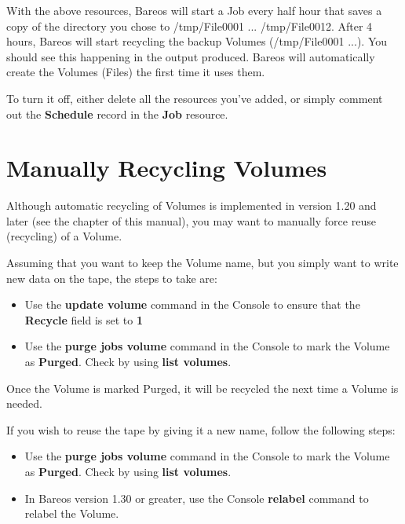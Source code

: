 With the above resources, Bareos will start a Job every half hour that saves a
copy of the directory you chose to /tmp/File0001 ... /tmp/File0012. After 4
hours, Bareos will start recycling the backup Volumes (/tmp/File0001 ...). You
should see this happening in the output produced. Bareos will automatically
create the Volumes (Files) the first time it uses them.

To turn it off, either delete all the resources you've added, or simply
comment out the {\bf Schedule} record in the {\bf Job} resource.

\section{Manually Recycling Volumes}
\label{manualrecycling}


Although automatic recycling of Volumes is implemented in version 1.20 and
later (see the
 chapter of
this manual), you may want to manually force reuse (recycling) of a Volume.

Assuming that you want to keep the Volume name, but you simply want to write
new data on the tape, the steps to take are:

\begin{itemize}
\item Use the {\bf update volume} command in the Console to  ensure that the
   {\bf Recycle} field is set to {\bf 1}
\item Use the {\bf purge jobs volume} command in the Console  to mark the
   Volume as {\bf Purged}. Check by using  {\bf list volumes}.
\end{itemize}

Once the Volume is marked Purged, it will be recycled the next time a Volume
is needed.

If you wish to reuse the tape by giving it a new name, follow the following
steps:

\begin{itemize}
\item Use the {\bf purge jobs volume} command in the Console  to mark the
   Volume as {\bf Purged}. Check by using  {\bf list volumes}.
\item In Bareos version 1.30 or greater, use the Console  {\bf relabel}
   command to relabel the Volume.
\end{itemize}

